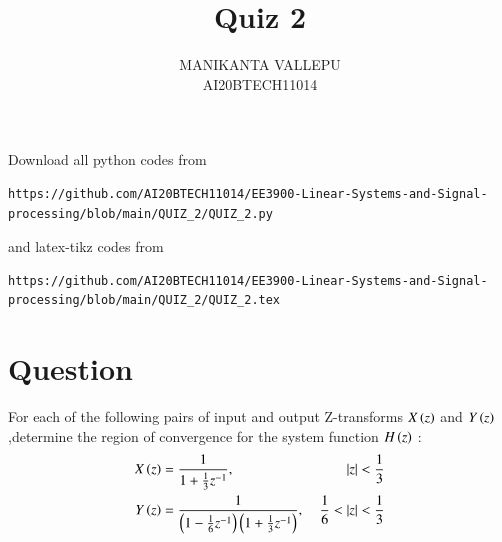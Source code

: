 \documentclass[journal,12pt,twocolumn]{IEEEtran}
\begin{document}
\title{Quiz 2}
\author{MANIKANTA VALLEPU \\ AI20BTECH11014}
\maketitle
\newpage
\bigskip
\renewcommand{\thefigure}{\theenumi}
\renewcommand{\thetable}{\theenumi}
Download all python codes from 
\begin{lstlisting}
https://github.com/AI20BTECH11014/EE3900-Linear-Systems-and-Signal-processing/blob/main/QUIZ_2/QUIZ_2.py
\end{lstlisting}
%
and latex-tikz codes from 
%
\begin{lstlisting}
https://github.com/AI20BTECH11014/EE3900-Linear-Systems-and-Signal-processing/blob/main/QUIZ_2/QUIZ_2.tex
\end{lstlisting}
%
\section{Question}
For each of the following pairs of input and output Z-transforms $X\left(z\right)$ and $Y\left(z\right)$,determine the region of convergence for the system function $H\left(z\right)$ : 
\begin{align}
    X\left(z\right) &= \dfrac{1}{1+ \frac{1}{3}z^{-1}} ,\ &\vert z\vert < \frac{1}{3} \label{a}\\
    Y\left(z\right) &= \dfrac{1}{\left(1- \frac{1}{6}z^{-1}\right)\left(1+ \frac{1}{3}z^{-1}\right)}, \ &\frac{1}{6} < \vert z\vert < \frac{1}{3} \label{b}
\end{align}
\end{document}
